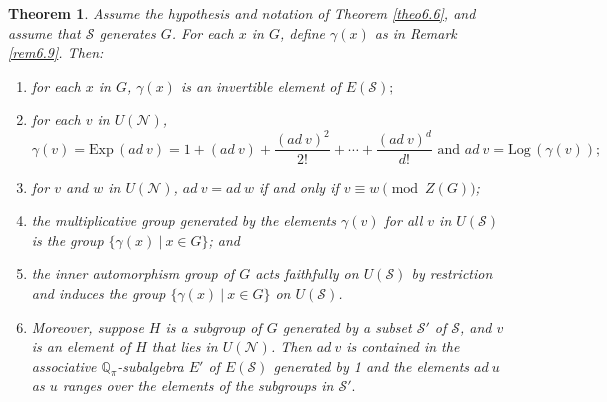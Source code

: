 \documentclass[mathscr]{amsart}
\theoremstyle{theorem}
\newtheorem{theorem}{Theorem}[section]
\theoremstyle{definition}
\numberwithin{equation}{section}
\def \({\left(}
\def \){\right)}
\def\Q{\mathbb{Q}}
\def\S{\mathcal{S}}
\def \Exp{\text{Exp}\,}
\def \Log{\text{Log}\,}
\begin{document}
\begin{theorem}\label{theo6.10}
Assume the hypothesis and notation of Theorem \ref{theo6.6}, and
assume that $\S$ generates $G$. For each $x$ in $G$, define
$\gamma(x)$ as in Remark \ref{rem6.9}. Then:
\begin{enumerate}
\item[(a)] for each $x$ in $G$, $\gamma(x)$ is an invertible
element of $E(\S);$
\item[(b)] for each $v$ in $U\(\mathcal{N}\)$,
$$\gamma(v)=\Exp(ad\ v)=1+(ad\ v)+\frac{(ad\ v)^2}{2!}+\cdots+\frac{(ad\ v)^d}{d!}
\text{ and }ad\ v=\Log(\gamma(v));$$
\item[(c)] for $v$ and $w$ in $U(\mathcal{N})$, $ad\ v=ad\ w$ if and only if
$v\equiv w \pmod{Z(G)}$;
\item[(d)] the multiplicative group generated by the elements
$\gamma(v)$ for all $v$ in $U(\S)$ is the group $\{\gamma(x)\ |\
x\in G\}$; and
\item[(e)] the inner automorphism group of $G$ acts faithfully on
$U(\S)$ by restriction and induces the group $\{\gamma(x)\ |\ x\in
G\}$ on $U(\S)$.
\item[(f)] Moreover, suppose $H$ is a subgroup of $G$ generated by a
subset $\S'$ of $\S$, and $v$ is an element of $H$ that lies in
$U(\mathcal{N})$. %
Then $ad\ v$ is contained in the associative $\Q_\pi$-subalgebra
$E'$ of $E(\S)$ generated by 1 and the elements $ad\ u$ as $u$
ranges over the elements of the subgroups in $\S'.$
\end{enumerate}
\end{theorem}
\end{document}
